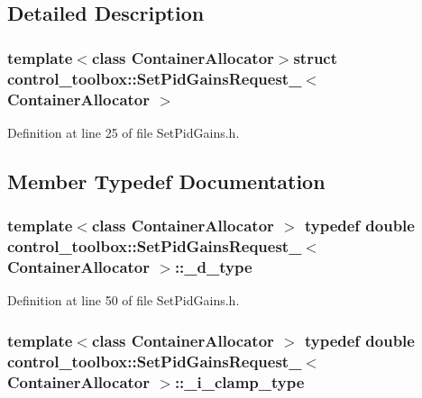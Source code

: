 \subsection{\-Detailed \-Description}
\subsubsection*{template$<$class Container\-Allocator$>$struct control\-\_\-toolbox\-::\-Set\-Pid\-Gains\-Request\-\_\-$<$ Container\-Allocator $>$}



\-Definition at line 25 of file \-Set\-Pid\-Gains.\-h.



\subsection{\-Member \-Typedef \-Documentation}
\subsubsection[{\-\_\-d\-\_\-type}]{\setlength{\rightskip}{0pt plus 5cm}template$<$class Container\-Allocator $>$ typedef double {\bf control\-\_\-toolbox\-::\-Set\-Pid\-Gains\-Request\-\_\-}$<$ \-Container\-Allocator $>$\-::{\bf \-\_\-d\-\_\-type}}\label{structcontrol__toolbox_1_1SetPidGainsRequest___ab05e0186a049b3833ce6d1393ac56a7f}


\-Definition at line 50 of file \-Set\-Pid\-Gains.\-h.

\subsubsection[{\-\_\-i\-\_\-clamp\-\_\-type}]{\setlength{\rightskip}{0pt plus 5cm}template$<$class Container\-Allocator $>$ typedef double {\bf control\-\_\-toolbox\-::\-Set\-Pid\-Gains\-Request\-\_\-}$<$ \-Container\-Allocator $>$\-::{\bf \-\_\-i\-\_\-clamp\-\_\-type}}\label{structcontrol__toolbox_1_1SetPidGainsRequest___a24f0ce552657dc1726ff781e6d87c4d8}


